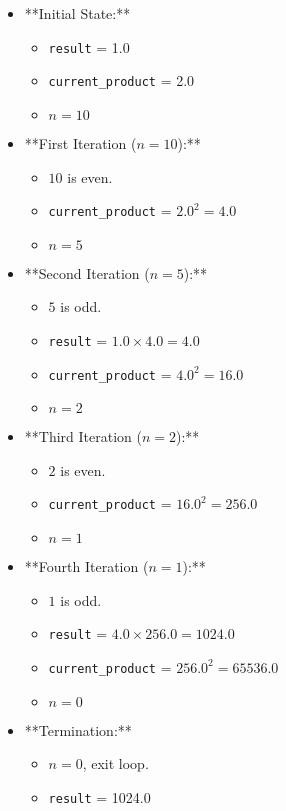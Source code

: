 \begin{itemize}
    \item **Initial State:**
    \begin{itemize}
        \item \texttt{result} = 1.0
        \item \texttt{current\_product} = 2.0
        \item \(n = 10\)
    \end{itemize}
    
    \item **First Iteration (\(n = 10\)):**
    \begin{itemize}
        \item \(10\) is even.
        \item \texttt{current\_product} = \(2.0^2 = 4.0\)
        \item \(n = 5\)
    \end{itemize}
    
    \item **Second Iteration (\(n = 5\)):**
    \begin{itemize}
        \item \(5\) is odd.
        \item \texttt{result} = \(1.0 \times 4.0 = 4.0\)
        \item \texttt{current\_product} = \(4.0^2 = 16.0\)
        \item \(n = 2\)
    \end{itemize}
    
    \item **Third Iteration (\(n = 2\)):**
    \begin{itemize}
        \item \(2\) is even.
        \item \texttt{current\_product} = \(16.0^2 = 256.0\)
        \item \(n = 1\)
    \end{itemize}
    
    \item **Fourth Iteration (\(n = 1\)):**
    \begin{itemize}
        \item \(1\) is odd.
        \item \texttt{result} = \(4.0 \times 256.0 = 1024.0\)
        \item \texttt{current\_product} = \(256.0^2 = 65536.0\)
        \item \(n = 0\)
    \end{itemize}
    
    \item **Termination:**
    \begin{itemize}
        \item \(n = 0\), exit loop.
        \item \texttt{result} = 1024.0
    \end{itemize}
\end{itemize}

